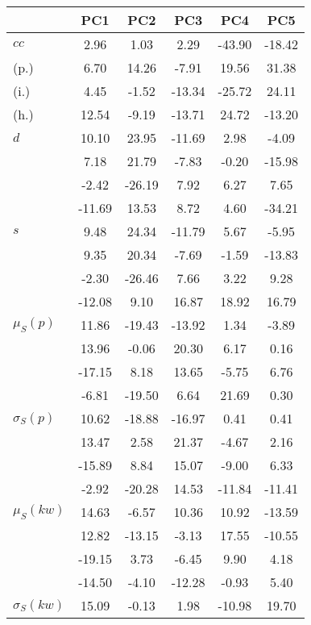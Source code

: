 \begin{table}[h!]
\begin{center}
\begin{tabular}{| l | c | c | c | c | c |}\hline
 & PC1 & PC2 & PC3 & PC4 & PC5 \\\hline
$cc$ & 2.96  & 1.03  & 2.29  & -43.90  & -18.42 \\\hline
(p.) & 6.70  & 14.26  & -7.91  & 19.56  & 31.38 \\\hline
(i.) & 4.45  & -1.52  & -13.34  & -25.72  & 24.11 \\\hline
(h.) & 12.54  & -9.19  & -13.71  & 24.72  & -13.20 \\\hline
$d$ & 10.10  & 23.95  & -11.69  & 2.98  & -4.09 \\\hline
 & 7.18  & 21.79  & -7.83  & -0.20  & -15.98 \\\hline
 & -2.42  & -26.19  & 7.92  & 6.27  & 7.65 \\\hline
 & -11.69  & 13.53  & 8.72  & 4.60  & -34.21 \\\hline
$s$ & 9.48  & 24.34  & -11.79  & 5.67  & -5.95 \\\hline
 & 9.35  & 20.34  & -7.69  & -1.59  & -13.83 \\\hline
 & -2.30  & -26.46  & 7.66  & 3.22  & 9.28 \\\hline
 & -12.08  & 9.10  & 16.87  & 18.92  & 16.79 \\\hline
$\mu_S(p)$ & 11.86  & -19.43  & -13.92  & 1.34  & -3.89 \\\hline
 & 13.96  & -0.06  & 20.30  & 6.17  & 0.16 \\\hline
 & -17.15  & 8.18  & 13.65  & -5.75  & 6.76 \\\hline
 & -6.81  & -19.50  & 6.64  & 21.69  & 0.30 \\\hline
$\sigma_S(p)$ & 10.62  & -18.88  & -16.97  & 0.41  & 0.41 \\\hline
 & 13.47  & 2.58  & 21.37  & -4.67  & 2.16 \\\hline
 & -15.89  & 8.84  & 15.07  & -9.00  & 6.33 \\\hline
 & -2.92  & -20.28  & 14.53  & -11.84  & -11.41 \\\hline
$\mu_S(kw)$ & 14.63  & -6.57  & 10.36  & 10.92  & -13.59 \\\hline
 & 12.82  & -13.15  & -3.13  & 17.55  & -10.55 \\\hline
 & -19.15  & 3.73  & -6.45  & 9.90  & 4.18 \\\hline
 & -14.50  & -4.10  & -12.28  & -0.93  & 5.40 \\\hline
$\sigma_S(kw)$ & 15.09  & -0.13  & 1.98  & -10.98  & 19.70 \\\hline

\end{tabular}
\end{center}
\end{table}
